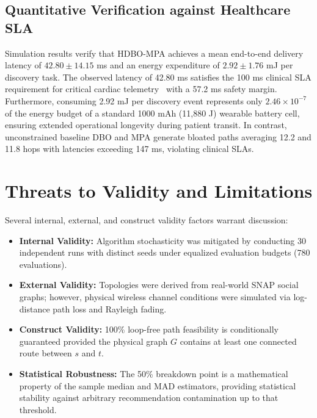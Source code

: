 \documentclass[journal,compsoc]{IEEEtran}
\begin{document}
\subsection{Quantitative Verification against Healthcare SLA}
Simulation results verify that HDBO-MPA achieves a mean end-to-end delivery latency of $42.80 \pm 14.15$ ms and an energy expenditure of $2.92 \pm 1.76$ mJ per discovery task. The observed latency of 42.80 ms satisfies the 100 ms clinical SLA requirement for critical cardiac telemetry~\cite{javaid2021low} with a 57.2 ms safety margin. Furthermore, consuming 2.92 mJ per discovery event represents only $2.46 \times 10^{-7}$ of the energy budget of a standard 1000 mAh (11,880 J) wearable battery cell, ensuring extended operational longevity during patient transit. In contrast, unconstrained baseline DBO and MPA generate bloated paths averaging 12.2 and 11.8 hops with latencies exceeding 147 ms, violating clinical SLAs.

\section{Threats to Validity and Limitations}
Several internal, external, and construct validity factors warrant discussion:
\begin{itemize}
    \item \textbf{Internal Validity:} Algorithm stochasticity was mitigated by conducting 30 independent runs with distinct seeds under equalized evaluation budgets (780 evaluations).
    \item \textbf{External Validity:} Topologies were derived from real-world SNAP social graphs; however, physical wireless channel conditions were simulated via log-distance path loss and Rayleigh fading.
    \item \textbf{Construct Validity:} 100\% loop-free path feasibility is conditionally guaranteed provided the physical graph $G$ contains at least one connected route between $s$ and $t$.
    \item \textbf{Statistical Robustness:} The 50\% breakdown point is a mathematical property of the sample median and MAD estimators, providing statistical stability against arbitrary recommendation contamination up to that threshold.
\end{itemize}
\end{document}
